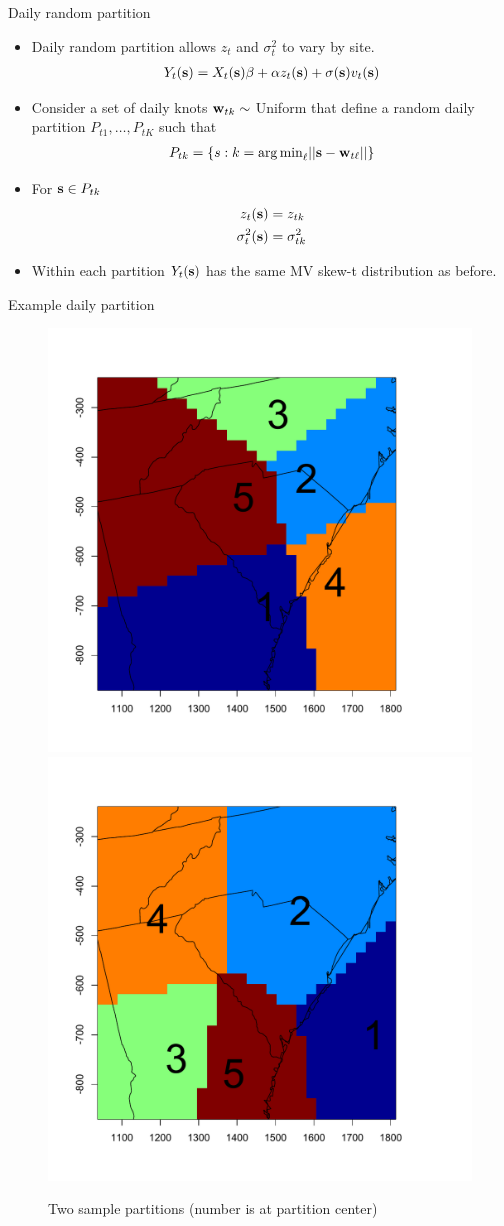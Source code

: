 \documentclass{beamer}
\begin{document}
\begin{frame}{Daily random partition}
  \begin{itemize} \setlength{\itemsep}{0.5em}
    \item Daily random partition allows $z_t$ and $\sigma^2_t$ to vary by site.
    \begin{align*}
      Y_t(\mbox{\bf s}) = X_t(\mbox{\bf s}) \beta + \alpha z_t(\mbox{\bf s}) + \sigma(\mbox{\bf s}) v_t(\mbox{\bf s})
    \end{align*}
    \item Consider a set of daily knots $\mbox{\bf w}_{tk} \sim$ Uniform that define a random daily partition
    $P_{t1}, \ldots, P_{tK}$ such that
    \begin{align*}
      P_{tk} = \{s : k = {\mathop{\rm arg\, min}}_\ell|| \mbox{\bf s} - \mbox{\bf w}_{t\ell}|| \}
    \end{align*}
    \item For $\mbox{\bf s} \in P_{tk}$
    \begin{align*}
      z_t(\mbox{\bf s}) &= z_{tk}\\
      \sigma^2_t(\mbox{\bf s}) &= \sigma^2_{tk}
    \end{align*}
    \item Within each partition $Y_t(\mbox{\bf s})$ has the same MV skew-t distribution as before.
  \end{itemize}
\end{frame}

\begin{frame}{Example daily partition}
    \centering
    \begin{figure}
    \includegraphics[width=0.54\linewidth]{./plots/example-partition-1.pdf}
    \includegraphics[width=0.54\linewidth]{./plots/example-partition-2.pdf}
    \caption{Two sample partitions (number is at partition center)}
    \end{figure}
\end{frame}
\end{document}
